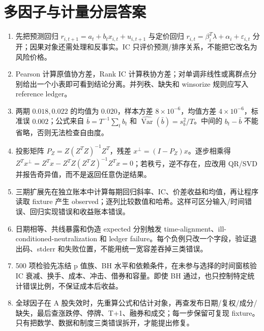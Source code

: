 \chapter{多因子与计量分层答案}

\begin{enumerate}[leftmargin=*]
  \item 先把预测回归 $r_{i,t+1}=a_t+b_tx_{i,t}+u_{i,t+1}$ 与定价回归 $r_{i,t}=\beta_i^T\lambda+\alpha_i+\varepsilon_{i,t}$ 分开；因果对象还需处理和反事实。IC 只评价预测/排序关系，不能把它改名为风险价格。
  \item Pearson 计算原值协方差，Rank IC 计算秩协方差；对单调非线性或离群点分别给出一个小表即可看到结论分离。并列秩、缺失和 winsorize 规则应写入 reference ledger。
  \item 两期 $0.018,0.022$ 的均值为 $0.020$，样本方差 $8\times10^{-6}$，均值方差 $4\times10^{-6}$，标准误 $0.002$；公式来自 $\bar b=T^{-1}\sum_tb_t$ 和 $\widehat{\operatorname{Var}}(\bar b)=s_b^2/T$。中间的 $b_t-\bar b$ 不能省略，否则无法检查自由度。
  \item 投影矩阵 $P_Z=Z(Z^TZ)^{-1}Z^T$，残差 $x^\perp=(I-P_Z)x$。逐步相乘得 $Z^Tx^\perp=Z^Tx-Z^TZ(Z^TZ)^{-1}Z^Tx=0$；若秩亏，逆不存在，应改用 QR/SVD 并报告奇异值，而不是返回任意伪逆结果。
  \item 三期扩展先在独立账本中计算每期回归斜率、IC、价差收益和均值，再让程序读取 fixture 产生 observed；逐列比较数值和哈希。这样可区分输入/时间错误、回归实现错误和收益账本错误。
  \item 日期相等、共线暴露和伪造 expected 分别触发 time-alignment、ill-conditioned-neutralization 和 ledger failure。每个负例只改一个字段，验证退出码、stderr 和失败位置，不能用统一宽容差吞掉三类错误。
  \item 500 项检验先冻结 p 值族、BH 水平和依赖条件，在未参与选择的时间窗核验 IC 衰减、换手、成本、冲击、借券和容量。即使 BH 通过，也只控制特定统计错误比例，不保证成本后收益。
  \item 全球因子在 A 股失效时，先重算公式和估计对象，再查发布日期/复权/成分/缺失，最后查涨跌停、停牌、T+1、融券和成交；每一步保留可复现 fixture。只有把数学、数据和制度三类错误拆开，才能提出修复。
\end{enumerate}
